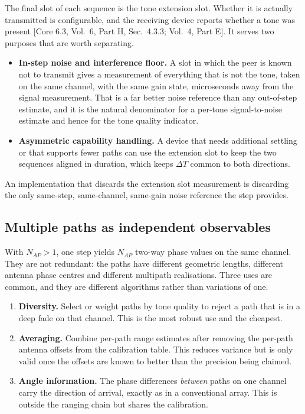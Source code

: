 \documentclass[11pt,a4paper]{article}
\newcommand{\Nap}{N_{AP}}
\newcommand{\core}[1]{\textcolor{rulegrey}{\small[Core 6.3, #1]}}
\begin{document}
The final slot of each sequence is the tone extension slot. Whether it is actually transmitted is
configurable, and the receiving device reports whether a tone was present
\core{Vol.\ 6, Part H, Sec.\ 4.3.3; Vol.\ 4, Part E}. It serves two purposes that are worth
separating.

\begin{itemize}[leftmargin=1.4em,itemsep=1pt]
  \item \textbf{In-step noise and interference floor.} A slot in which the peer is known not to
    transmit gives a measurement of everything that is not the tone, taken on the same channel, with
    the same gain state, microseconds away from the signal measurement. That is a far better noise
    reference than any out-of-step estimate, and it is the natural denominator for a per-tone
    signal-to-noise estimate and hence for the tone quality indicator.
  \item \textbf{Asymmetric capability handling.} A device that needs additional settling or that
    supports fewer paths can use the extension slot to keep the two sequences aligned in duration,
    which keeps $\Delta T$ common to both directions.
\end{itemize}

An implementation that discards the extension slot measurement is discarding the only same-step,
same-channel, same-gain noise reference the step provides.

\subsection{Multiple paths as independent observables}

With $\Nap>1$, one step yields $\Nap$ two-way phase values on the same channel. They are not
redundant: the paths have different geometric lengths, different antenna phase centres and
different multipath realisations. Three uses are common, and they are different algorithms rather
than variations of one.

\begin{enumerate}[leftmargin=1.6em,itemsep=1pt]
  \item \textbf{Diversity.} Select or weight paths by tone quality to reject a path that is in a
    deep fade on that channel. This is the most robust use and the cheapest.
  \item \textbf{Averaging.} Combine per-path range estimates after removing the per-path antenna
    offsets from the calibration table. This reduces variance but is only valid once the offsets are
    known to better than the precision being claimed.
  \item \textbf{Angle information.} The phase differences \emph{between} paths on one channel carry
    the direction of arrival, exactly as in a conventional array. This is outside the ranging chain
    but shares the calibration.
\end{enumerate}
\end{document}
